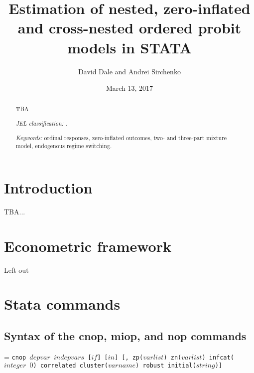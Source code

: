 \documentclass[letterpaper,fleqn,11pt]{article}
\begin{document}
\title{Estimation of nested, zero-inflated and cross-nested ordered probit
models in STATA\\
\bigskip \bigskip }
\author{David Dale and Andrei Sirchenko}
\date{March 13, 2017}
\maketitle

\begin{abstract}
TBA

\bigskip \bigskip \bigskip \bigskip

\textit{JEL classification:} \bigskip .

\textit{Keywords:} ordinal responses, zero-inflated outcomes, two- and
three-part mixture model, endogenous regime switching.
\end{abstract}


\section{Introduction}

TBA...

\section{Econometric framework}

Left out

\section{Stata commands}

\subsection*{Syntax of the cnop, miop, and nop commands}


\hangindent=\parindent
\noindent \texttt{cnop $depvar$ $indepvars$ [$if$] [$in$] [, zp($varlist$)
zn($varlist$) infcat($integer$ $0$) correlated cluster($varname$) robust
initial($string$)] }
\end{document}
